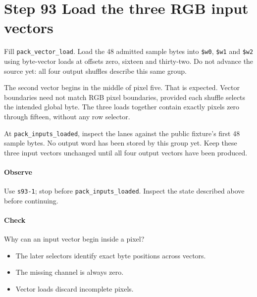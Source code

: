 \section{Step 93 Load the three RGB input vectors}
Fill \texttt{pack\_vector\_load}. Load the 48 admitted sample bytes into \texttt{\$w0}, \texttt{\$w1} and \texttt{\$w2} using byte-vector loads at offsets zero, sixteen and thirty-two. Do not advance the source yet: all four output shuffles describe this same group.

The second vector begins in the middle of pixel five. That is expected. Vector boundaries need not match RGB pixel boundaries, provided each shuffle selects the intended global byte. The three loads together contain exactly pixels zero through fifteen, without any row selector.

At \texttt{pack\_inputs\_loaded}, inspect the lanes against the public fixture’s first 48 sample bytes. No output word has been stored by this group yet. Keep these three input vectors unchanged until all four output vectors have been produced.

\paragraph{Observe} Use \texttt{s93-1}; stop before \texttt{pack\_inputs\_loaded}. Inspect the state described above before continuing.

\paragraph{Check} Why can an input vector begin inside a pixel?
\begin{itemize}
  \item[A.] The later selectors identify exact byte positions across vectors.
  \item[B.] The missing channel is always zero.
  \item[C.] Vector loads discard incomplete pixels.
\end{itemize}
